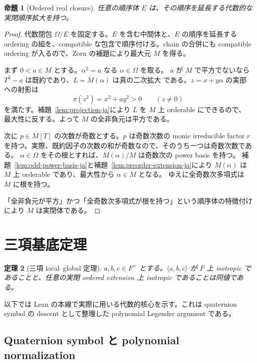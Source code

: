 \documentclass[uplatex,dvipdfmx]{jsarticle}
\newtheorem{theorem}{定理}
\newtheorem{proposition}[theorem]{命題}
\theoremstyle{definition}
\theoremstyle{remark}
\begin{document}
\begin{proposition}[Ordered real closure]\label{prop:orc-ja}
任意の順序体 $E$ は、その順序を延長する代数的な実閉順序拡大を持つ。
\end{proposition}
\begin{proof}
代数閉包 $\Omega/E$ を固定する。$E$ を含む中間体と、$E$ の順序を延長する
ordering の組を、compatible な包含で順序付ける。chain の合併にも compatible ordering
が入るので、Zorn の補題により最大元 $M$ を得る。

まず $0<a\in M$ とする。$\alpha^2=a$ なる $\alpha\in\Omega$ を取る。
$a$ が $M$ で平方でないなら $T^2-a$ は既約であり、$L=M(\alpha)$ は真の二次拡大
である。$z=x+y\alpha$ の実部への射影は
\[
  \pi(z^2)=x^2+a y^2>0\qquad(z\ne0)
\]
を満たす。補題~\ref{lem:projection-ja}により $L$ を $M$ 上 orderable にできるので、
最大性に反する。よって $M$ の全非負元は平方である。

次に $p\in M[T]$ の次数が奇数とする。$p$ は奇数次数の monic irreducible factor
$r$ を持つ。実際、既約因子の次数の和が奇数なので、そのうち一つは奇数次数である。
$\alpha\in\Omega$ をその根とすれば、$M(\alpha)/M$ は奇数次の power basis を持つ。
補題~\ref{lem:odd-power-basis-ja}と補題~\ref{lem:preorder-extension-ja}により
$M(\alpha)$ は $M$ 上 orderable であり、最大性から $\alpha\in M$ となる。
ゆえに全奇数次多項式は $M$ に根を持つ。

「全非負元が平方」かつ「全奇数次多項式が根を持つ」という順序体の特徴付けにより
$M$ は実閉体である。
\end{proof}

\section{三項基底定理}

\begin{theorem}[三項 local--global 定理]\label{thm:ternary-ja}
$a,b,c\in F^\times$ とする。$\langle a,b,c\rangle$ が $F$ 上 isotropic
であることと、任意の実閉 ordered extension 上 isotropic であることは同値である。
\end{theorem}

以下では Lean の本線で実際に用いる代数的核心を示す。これは quaternion symbol の
descent として整理した polynomial Legendre argument である。

\subsection{Quaternion symbol と polynomial normalization}
\end{document}
